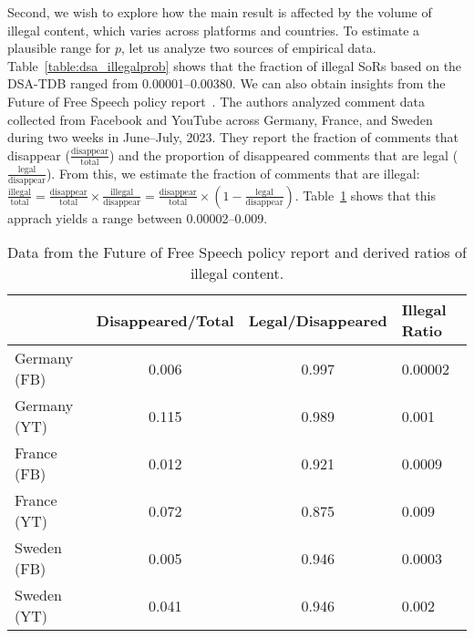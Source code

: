 \documentclass{article}
\begin{document}
Second, we wish to explore how the main result is affected by the volume of illegal content, which varies across platforms and countries.
To estimate a plausible range for $p$, let us analyze two sources of empirical data. 
Table~\ref{table:dsa_illegalprob} shows that the fraction of illegal SoRs based on the DSA-TDB ranged from 0.00001--0.00380.
We can also obtain insights from the Future of Free Speech policy report~\cite{futurefreespeech2024}. The authors analyzed comment data collected from Facebook and YouTube across Germany, France, and Sweden during two weeks in June--July, 2023. 
They report the fraction of comments that disappear ($\frac{\text{disappear}}{\text{total}}$) and the proportion of disappeared comments that are legal ($\frac{\text{legal}}{\text{disappear}}$). From this, we estimate the fraction of comments that are illegal: $\frac{\text{illegal}}{\text{total}} = \frac{\text{disappear}}{\text{total}} \times \frac{\text{illegal}}{\text{disappear}} = \frac{\text{disappear}}{\text{total}} \times (1 - \frac{\text{legal}}{\text{disappear}})$. 
Table~\ref{table:futurefreespeech_illegalprob} shows that this apprach yields a range between 0.00002--0.009. 

\begin{table}
\centering
\caption{Data from the Future of Free Speech policy report and derived ratios of illegal content.}
\begin{tabular}{lccl}
\hline
 & Disappeared/Total & Legal/Disappeared & Illegal Ratio \\
\hline
Germany (FB) &  0.006 & 0.997 & 0.00002 \\
Germany (YT) &  0.115 & 0.989 & 0.001 \\
France (FB) &  0.012 & 0.921 & 0.0009 \\
France (YT) &  0.072 & 0.875 & 0.009 \\
Sweden (FB) &  0.005 & 0.946 & 0.0003 \\
Sweden (YT) &  0.041 & 0.946 & 0.002 \\
\hline
\end{tabular}
\label{table:futurefreespeech_illegalprob}
\end{table}
\end{document}
